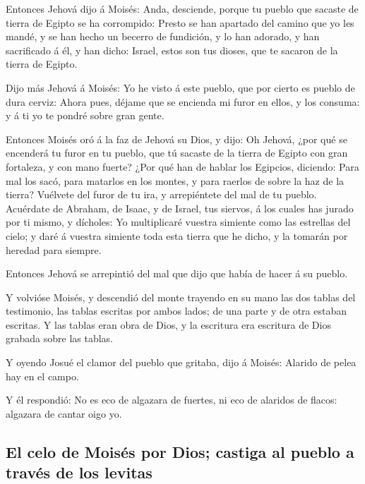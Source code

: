  Entonces Jehová dijo á Moisés: Anda, desciende, porque tu
pueblo que sacaste de tierra de Egipto se ha corrompido: 
Presto se han apartado del camino que yo les mandé, y se han hecho un
becerro de fundición, y lo han adorado, y han sacrificado á él, y han
dicho: Israel, estos son tus dioses, que te sacaron de la tierra de
Egipto.

 Dijo más Jehová á Moisés: Yo he visto á este pueblo, que
por cierto es pueblo de dura cerviz:  Ahora pues, déjame
que se encienda mi furor en ellos, y los consuma: y á ti yo te pondré
sobre gran gente.

 Entonces Moisés oró á la faz de Jehová su Dios, y dijo:
Oh Jehová, ¿por qué se encenderá tu furor en tu pueblo, que tú sacaste
de la tierra de Egipto con gran fortaleza, y con mano fuerte?
 ¿Por qué han de hablar los Egipcios, diciendo: Para mal
los sacó, para matarlos en los montes, y para raerlos de sobre la haz de
la tierra? Vuélvete del furor de tu ira, y arrepiéntete del mal de tu
pueblo.  Acuérdate de Abraham, de Isaac, y de Israel, tus
siervos, á los cuales has jurado por ti mismo, y dícholes: Yo
multiplicaré vuestra simiente como las estrellas del cielo; y daré á
vuestra simiente toda esta tierra que he dicho, y la tomarán por heredad
para siempre.

 Entonces Jehová se arrepintió del mal que dijo que había
de hacer á su pueblo.

 Y volvióse Moisés, y descendió del monte trayendo en su
mano las dos tablas del testimonio, las tablas escritas por ambos lados;
de una parte y de otra estaban escritas.  Y las tablas
eran obra de Dios, y la escritura era escritura de Dios grabada sobre
las tablas.

 Y oyendo Josué el clamor del pueblo que gritaba, dijo á
Moisés: Alarido de pelea hay en el campo.

 Y él respondió: No es eco de algazara de fuertes, ni eco
de alaridos de flacos: algazara de cantar oigo yo.

\hypertarget{el-celo-de-moisuxe9s-por-dios-castiga-al-pueblo-a-travuxe9s-de-los-levitas}{%
\subsection{El celo de Moisés por Dios; castiga al pueblo a través de
los
levitas}\label{el-celo-de-moisuxe9s-por-dios-castiga-al-pueblo-a-travuxe9s-de-los-levitas}}

